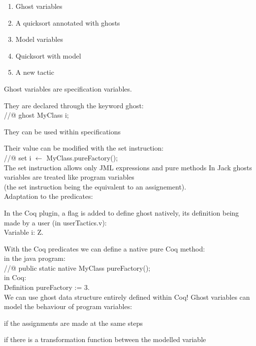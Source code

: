 \begin{enumerate}
\item Ghost variables 
\item A quicksort annotated with ghosts
\item Model variables
\item Quicksort with model
\item A new tactic
\end{enumerate}

\small
\blist
\item Ghost variables are {\purple specification} variables.
\item They are declared through the keyword ghost:\\
//@ {\purple ghost} MyClass i;
\item They can be used within specifications
\item Their value can be {\purple modified} with the set instruction:\\
//@ {\purple set} i $\leftarrow$ MyClass.pureFactory();\\
The set instruction allows only JML {\purple expressions and pure methods}
\elist
{}
\small
In Jack ghosts variables are treated like {\purple program variables} \\(the
set instruction being the equivalent to an assignement).\\
Adaptation to the predicates:
\blist
\item In the Coq plugin, a flag is added to define {\purple ghost natively}, 
its definition being made by a user (in userTactics.v):\\
Variable i: Z.
\item With the Coq predicates we can define a native pure Coq method: \\
in the java program:\\
//@ public static native MyClass pureFactory();\\
in Coq:\\
Definition pureFactory := 3.\\
\rarrow We can use ghost data structure {\purple entirely defined} within Coq!
\elist
{}
\small
Ghost variables can model the behaviour of program variables:
\blist
\item if the assignments are made at the {\purple same steps}
\item if there is a {\purple transformation function} between the modelled variable
